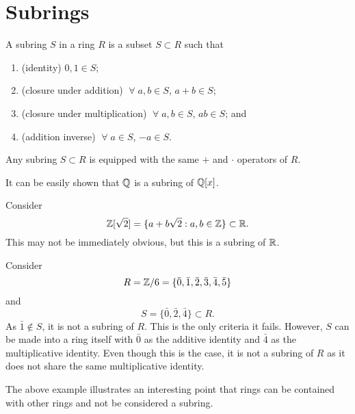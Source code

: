 \section{Subrings}

\begin{definition}[Subring]
    A subring $S$ in a ring $R$ is a subset $S \subset R$ such that
    \begin{enumerate}
        \item (identity) $0, 1 \in S$;
        \item (closure under addition) $\;\forall\; a, b \in S$, $a + b \in S$;
        \item (closure under multiplication) $\;\forall\; a, b \in S$, $ab \in S$; and
        \item (addition inverse) $\;\forall\; a \in S$, $-a \in S$.
    \end{enumerate}
\end{definition}

\begin{remark}
    Any subring $S \subset R$ is equipped with the same $+$ and $\cdot$ operators of $R$.
\end{remark}

\begin{example}
    It can be easily shown that $\mathbb{Q}$ is a subring of $\mathbb{Q}[x]$.
\end{example}

\begin{example}
    Consider
    \[ \mathbb{Z}[\sqrt 2] = \{ a + b\sqrt 2 : a, b \in \mathbb{Z} \} \subset \mathbb{R}. \]
    This may not be immediately obvious, but this is a subring of $\mathbb{R}$.
\end{example}

\begin{example}
    Consider 
    \[ R = \mathbb{Z} / 6 = \{ \bar 0, \bar 1, \bar 2, \bar 3, \bar 4, \bar 5 \} \]
    and
    \[ S = \{ \bar 0, \bar 2, \bar 4 \} \subset R. \]
    As $\bar 1 \not \in S$, it is not a subring of $R$. This is the only criteria it fails. However, $S$ can be made into a ring itself with $\bar 0$ as the additive identity and $\bar 4$ as the multiplicative identity. Even though this is the case, it is not a subring of $R$ as it does not share the same multiplicative identity.
\end{example}

\begin{remark}
    The above example illustrates an interesting point that rings can be contained with other rings and not be considered a subring. 
\end{remark}

